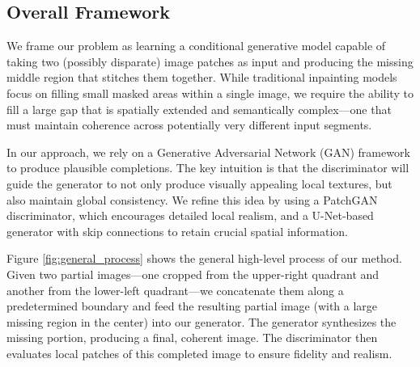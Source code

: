 \documentclass[sigconf]{acmart}
\begin{document}
\subsection*{Overall Framework}

We frame our problem as learning a conditional generative model capable of taking two (possibly disparate) image patches as input and producing the missing middle region that stitches them together. While traditional inpainting models focus on filling small masked areas within a single image, we require the ability to fill a large gap that is spatially extended and semantically complex—one that must maintain coherence across potentially very different input segments.

In our approach, we rely on a Generative Adversarial Network (GAN) framework to produce plausible completions. The key intuition is that the discriminator will guide the generator to not only produce visually appealing local textures, but also maintain global consistency. We refine this idea by using a PatchGAN discriminator, which encourages detailed local realism, and a U-Net-based generator with skip connections to retain crucial spatial information.

Figure \ref{fig:general_process} shows the general high-level process of our method. Given two partial images—one cropped from the upper-right quadrant and another from the lower-left quadrant—we concatenate them along a predetermined boundary and feed the resulting partial image (with a large missing region in the center) into our generator. The generator synthesizes the missing portion, producing a final, coherent image. The discriminator then evaluates local patches of this completed image to ensure fidelity and realism.
\end{document}
